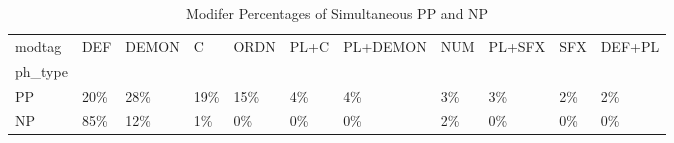 \begin{table}[htbp!]
\centering
\caption{Modifer Percentages of Simultaneous PP and NP}
\label{table:simmod_pc}
\begin{adjustbox}{width=1\textwidth}
\begin{tabular}{lllllllllll}
\toprule
modtag &  DEF & DEMON &    C & ORDN & PL+C & PL+DEMON & NUM & PL+SFX & SFX & DEF+PL \\
ph\_type &      &       &      &      &      &          &     &        &     &        \\
\midrule
PP      &  20\% &   28\% &  19\% &  15\% &   4\% &       4\% &  3\% &     3\% &  2\% &     2\% \\
NP      &  85\% &   12\% &   1\% &   0\% &   0\% &       0\% &  2\% &     0\% &  0\% &     0\% \\
\bottomrule
\end{tabular}
\end{adjustbox}
\end{table}

